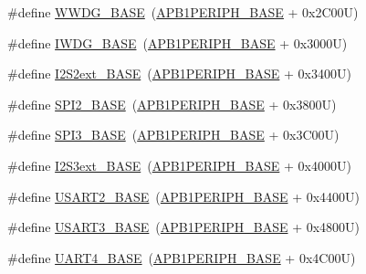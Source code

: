 \begin{DoxyCompactItemize}
\item 
\#define \hyperlink{group___peripheral__memory__map_ga9a5bf4728ab93dea5b569f5b972cbe62}{W\+W\+D\+G\+\_\+\+B\+A\+SE}~(\hyperlink{group___peripheral__memory__map_ga45666d911f39addd4c8c0a0ac3388cfb}{A\+P\+B1\+P\+E\+R\+I\+P\+H\+\_\+\+B\+A\+SE} + 0x2\+C00\+U)
\item 
\#define \hyperlink{group___peripheral__memory__map_ga8543ee4997296af5536b007cd4748f55}{I\+W\+D\+G\+\_\+\+B\+A\+SE}~(\hyperlink{group___peripheral__memory__map_ga45666d911f39addd4c8c0a0ac3388cfb}{A\+P\+B1\+P\+E\+R\+I\+P\+H\+\_\+\+B\+A\+SE} + 0x3000\+U)
\item 
\#define \hyperlink{group___peripheral__memory__map_gaa5f7b241ed5b756decd835300c9e7bc9}{I2\+S2ext\+\_\+\+B\+A\+SE}~(\hyperlink{group___peripheral__memory__map_ga45666d911f39addd4c8c0a0ac3388cfb}{A\+P\+B1\+P\+E\+R\+I\+P\+H\+\_\+\+B\+A\+SE} + 0x3400\+U)
\item 
\#define \hyperlink{group___peripheral__memory__map_gac3e357b4c25106ed375fb1affab6bb86}{S\+P\+I2\+\_\+\+B\+A\+SE}~(\hyperlink{group___peripheral__memory__map_ga45666d911f39addd4c8c0a0ac3388cfb}{A\+P\+B1\+P\+E\+R\+I\+P\+H\+\_\+\+B\+A\+SE} + 0x3800\+U)
\item 
\#define \hyperlink{group___peripheral__memory__map_gae634fe8faa6922690e90fbec2fc86162}{S\+P\+I3\+\_\+\+B\+A\+SE}~(\hyperlink{group___peripheral__memory__map_ga45666d911f39addd4c8c0a0ac3388cfb}{A\+P\+B1\+P\+E\+R\+I\+P\+H\+\_\+\+B\+A\+SE} + 0x3\+C00\+U)
\item 
\#define \hyperlink{group___peripheral__memory__map_ga89b61d6e6b09e94f3fccb7bef34e0263}{I2\+S3ext\+\_\+\+B\+A\+SE}~(\hyperlink{group___peripheral__memory__map_ga45666d911f39addd4c8c0a0ac3388cfb}{A\+P\+B1\+P\+E\+R\+I\+P\+H\+\_\+\+B\+A\+SE} + 0x4000\+U)
\item 
\#define \hyperlink{group___peripheral__memory__map_gade83162a04bca0b15b39018a8e8ec090}{U\+S\+A\+R\+T2\+\_\+\+B\+A\+SE}~(\hyperlink{group___peripheral__memory__map_ga45666d911f39addd4c8c0a0ac3388cfb}{A\+P\+B1\+P\+E\+R\+I\+P\+H\+\_\+\+B\+A\+SE} + 0x4400\+U)
\item 
\#define \hyperlink{group___peripheral__memory__map_gabe0d6539ac0026d598274ee7f45b0251}{U\+S\+A\+R\+T3\+\_\+\+B\+A\+SE}~(\hyperlink{group___peripheral__memory__map_ga45666d911f39addd4c8c0a0ac3388cfb}{A\+P\+B1\+P\+E\+R\+I\+P\+H\+\_\+\+B\+A\+SE} + 0x4800\+U)
\item 
\#define \hyperlink{group___peripheral__memory__map_ga94d92270bf587ccdc3a37a5bb5d20467}{U\+A\+R\+T4\+\_\+\+B\+A\+SE}~(\hyperlink{group___peripheral__memory__map_ga45666d911f39addd4c8c0a0ac3388cfb}{A\+P\+B1\+P\+E\+R\+I\+P\+H\+\_\+\+B\+A\+SE} + 0x4\+C00\+U)

\end{DoxyCompactItemize}
